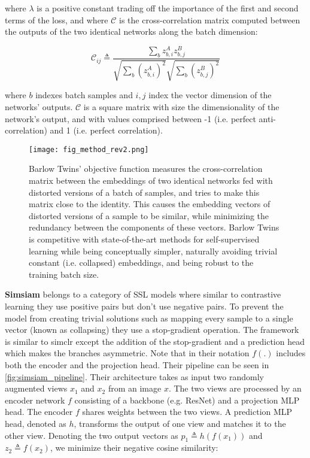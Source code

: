 \documentclass[../thesis.tex]{subfiles}
\begin{document}
	where $\lambda$ is a positive constant trading off the importance of the first and second terms of the loss, and where $\mathcal{C}$ is the cross-correlation matrix computed between the outputs of the two identical networks along the batch dimension:
	
	\begin{equation}
	\mathcal{C}_{ij} \triangleq \frac{
		\sum_b z^A_{b,i} z^B_{b,j}}
	{\sqrt{\sum_b {(z^A_{b,i})}^2} \sqrt{\sum_b {(z^B_{b,j})}^2}}
	\label{eq:crosscorr}
	\end{equation}
	
	where $b$ indexes batch samples and $i,j$ index the vector dimension of the networks' outputs. $\mathcal{C}$ is a square matrix with size the dimensionality of the network's output, and with values comprised between -1 (i.e. perfect anti-correlation) and 1 (i.e. perfect correlation).
	
	
	\begin{figure}[ht]
		\vskip 0.2in
		\begin{center}
			\centerline{\texttt{[image: fig\_method\_rev2.png]}}
			\caption{Barlow Twins' objective function measures the cross-correlation matrix between the embeddings of two identical networks fed with distorted versions of a batch of samples, and tries to make this matrix close to the identity. This causes the embedding vectors of distorted versions of a sample to be similar, while minimizing the redundancy between the components of these vectors. Barlow Twins is competitive with state-of-the-art methods for self-supervised learning while being conceptually simpler, naturally avoiding trivial constant (i.e. collapsed) embeddings, and being robust to the training batch size.}
			\label{fig:barlow_twins_method}
		\end{center}
		\vskip -0.2in
	\end{figure}
	
	\textbf{Simsiam} belongs to a category of SSL models where similar to contrastive learning they use positive pairs but don't use negative pairs. To prevent the model from creating trivial solutions such as mapping every sample to a single vector (known as collapsing) they use a stop-gradient operation. The framework is similar to simclr except the addition of the stop-gradient and a prediction head which makes the branches asymmetric. Note that in their notation $f(.)$ includes both the encoder and the projection head. Their pipeline can be seen in \ref{fig:simsiam_pipeline}. Their architecture takes as input two randomly augmented views $x_1$ and $x_2$ from an image $x$. The two views are processed by an encoder network $f$ consisting of a backbone (e.g. ResNet) and a projection MLP head. The encoder $f$ shares weights between the two views. A prediction MLP head, denoted as $h$, transforms the output of one view and matches it to the other view.
	Denoting the two output vectors as $p_1\!\triangleq\!h(f(x_1))$ and $z_2\!\triangleq\!f(x_2)$,
	we minimize their negative cosine similarity:
	
\end{document}
